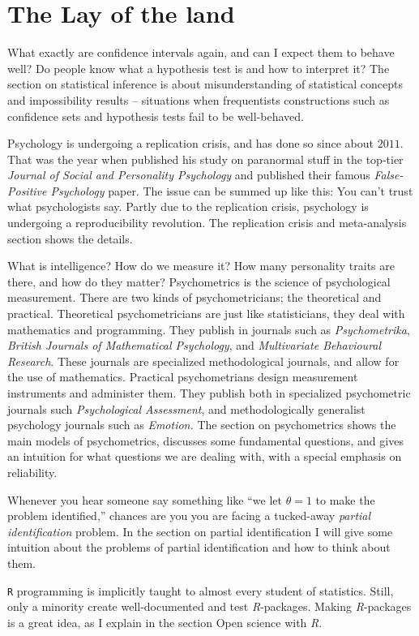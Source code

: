 \section{The Lay of the land}

What exactly are confidence intervals again, and can I expect them to behave well? Do people know what a hypothesis test is and how to interpret it? The section on statistical inference is about misunderstanding of statistical concepts and impossibility results -- situations when frequentists constructions such as confidence sets and hypothesis tests fail to be well-behaved. 

Psychology is undergoing a replication crisis, and has done so since about $2011$. That was the year when \textcite{Bem2011-vq} published his study on paranormal stuff in the top-tier \textit{Journal of Social and Personality Psychology} and \textcite{simmons_false-positive_2011} published their famous \textit{False-Positive Psychology} paper. The issue can be summed up like this: You can't trust what psychologists say. Partly due to the replication crisis, psychology is undergoing a reproducibility revolution. The replication crisis and meta-analysis section shows the details.

What is intelligence? How do we measure it? How many personality traits are there, and how do they matter? Psychometrics is the science of psychological measurement. There are two kinds of psychometricians; the theoretical and practical. Theoretical psychometricians are just like statisticians, they deal with mathematics and programming. They publish in journals such as \textit{Psychometrika}, \textit{British Journals of Mathematical Psychology}, and \textit{Multivariate Behavioural Research}. These journals are specialized methodological journals, and allow for the use of mathematics. Practical psychometrians design measurement instruments and administer them. They publish both in specialized psychometric journals such \textit{Psychological Assessment}, and methodologically generalist psychology journals such as \textit{Emotion.} The section on psychometrics shows the main models of psychometrics, discusses some fundamental questions, and gives an intuition for what questions we are dealing with, with a special emphasis on reliability.

Whenever you hear someone say something like ``we let $\theta=1$ to make the problem identified,'' chances are you you are facing a tucked-away \textit{partial identification} problem. In the section on partial identification I will give some intuition about the problems of partial identification and how to think about them.

\texttt{R} programming is implicitly taught to almost every student of statistics. Still, only a minority create well-documented and test \textit{R}-packages. Making \textit{R}-packages is a great idea, as I explain in the section Open science with \textit{R}.